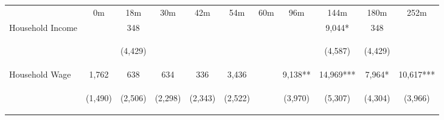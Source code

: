 \begin{tabular}{lcccccccccc}
\hline \noalign{\smallskip} & 0m & 18m & 30m & 42m & 54m & 60m & 96m & 144m & 180m & 252m\\
\noalign{\smallskip}\hline \noalign{\smallskip}Household Income &  & 348 &  &  &  &  &  & 9,044* & 348 & \\
 & \begin{footnotesize}\end{footnotesize} & \begin{footnotesize}(4,429)\end{footnotesize} & \begin{footnotesize}\end{footnotesize} & \begin{footnotesize}\end{footnotesize} & \begin{footnotesize}\end{footnotesize} & \begin{footnotesize}\end{footnotesize} & \begin{footnotesize}\end{footnotesize} & \begin{footnotesize}(4,587)\end{footnotesize} & \begin{footnotesize}(4,429)\end{footnotesize} & \begin{footnotesize}\end{footnotesize}\\
\noalign{\smallskip}Household Wage & 1,762 & 638 & 634 & 336 & 3,436 &  & 9,138** & 14,969*** & 7,964* & 10,617***\\
 & \begin{footnotesize}(1,490)\end{footnotesize} & \begin{footnotesize}(2,506)\end{footnotesize} & \begin{footnotesize}(2,298)\end{footnotesize} & \begin{footnotesize}(2,343)\end{footnotesize} & \begin{footnotesize}(2,522)\end{footnotesize} & \begin{footnotesize}\end{footnotesize} & \begin{footnotesize}(3,970)\end{footnotesize} & \begin{footnotesize}(5,307)\end{footnotesize} & \begin{footnotesize}(4,304)\end{footnotesize} & \begin{footnotesize}(3,966)\end{footnotesize}\\

\end{tabular}
